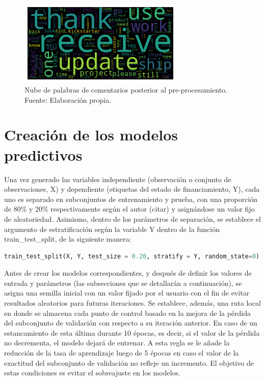 \begin{figure}[!ht]
	\begin{center}
		\includegraphics[width=0.7\textwidth]{4/figures/comments_wordcloud_processed.png}
		\caption{Nube de palabras de comentarios posterior al pre-procesamiento. Fuente: Elaboración propia.}
		\label{4:fig34}
	\end{center}
\end{figure}

\section{Creación de los modelos predictivos}
Una vez generado las variables independiente (observación o conjunto de observaciones, X) y dependiente (etiquetas del estado de financiamiento, Y), cada uno es separado en subconjuntos de entrenamiento y prueba, con una proporción de 80\% y 20\% respectivamente según el autor (citar) y asignándose un valor fijo de aleatoriedad. Asimismo, dentro de los parámetros de separación, se establece el argumento de estratificación según la variable Y dentro de la función train\_test\_split, de la siguiente manera:

\begin{lstlisting}[language=Python]
train_test_split(X, Y, test_size = 0.20, stratify = Y, random_state=0)
\end{lstlisting}

Antes de crear los modelos correspondientes, y después de definir los valores de entrada y parámetros (las subsecciones que se detallarán a continuación), se asigna una semilla inicial con un valor fijado por el usuario con el fin de evitar resultados aleatorios para futuras iteraciones. Se establece, además, una ruta local en donde se almacena cada punto de control basado en la mejora de la pérdida del subconjunto de validación con respecto a su iteración anterior. En caso de un estancamiento de esta última durante 10 épocas, es decir, si el valor de la pérdida no decrementa, el modelo dejará de entrenar. A esta regla se le añade la reducción de la tasa de aprendizaje luego de 5 épocas en caso el valor de la exactitud del subconjunto de validación no refleje un incremento. El objetivo de estas condiciones es evitar el sobreajuste en los modelos.

